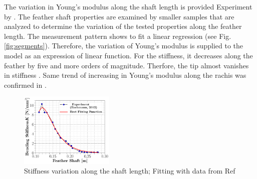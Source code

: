 The variation in Young’s modulus along the shaft length is provided Experiment by \citet{Bonser1995TheKeratin}. 
%
The feather shaft properties are examined by smaller samples that are analyzed to determine the variation of the tested properties along the feather length.
%
The measurement pattern shows to fit a linear regression (see Fig.\ref{fig:segments}).
%
Therefore, the variation of Young's modulus is supplied to  the model as an expression of linear function.
%
For the stiffness, it decreases along the feather by five and more orders of magnitude.
%
Therfore, the tip almost vanishes in stiffness \cite{Bostandzhiyan2008FlexuralShaft}.
%
Same trend of increasing in Young's modulus along the rachis was confirmed in \cite{Cameron2003YoungsFeathers}.


\begin{figure}[ht!]
\centering
\includegraphics[width=0.4\textwidth]{figs/Bending-distribution.pdf}
\caption{Stiffness variation along the shaft length; Fitting with data from Ref \cite{Bachmann2012FlexuralProperties}}
\label{fig:stiffness}
\end{figure}








